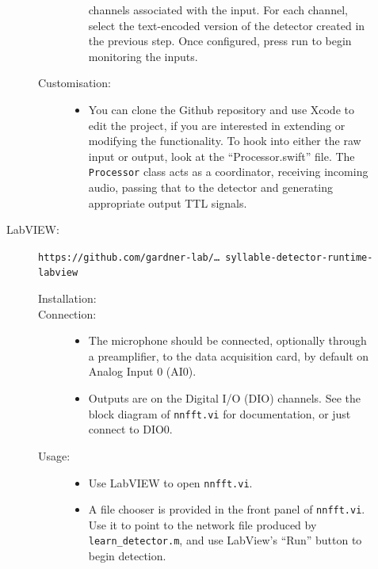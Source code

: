 \documentclass[10pt,letterpaper]{article}
\begin{document}
\begin{description}
\begin{description}
\begin{description}
\begin{itemize}
      channels associated with the input. For each channel, select the text-encoded version of 
      the detector created in the previous step. Once configured, press run to begin 
      monitoring the inputs.
      \end{itemize}
    \item[Customisation:]\hfill
      \begin{itemize}
      \item You can clone the Github repository and use Xcode to edit the project, if you 
      are interested in extending or modifying the functionality. To hook into either 
      the raw input or output, look at the ``Processor.swift'' file. The 
      {\tt Processor} class acts as a coordinator, receiving incoming audio, passing that
      to the detector and generating appropriate output TTL signals.
      \end{itemize}
    \end{description}
  \item[LabVIEW:] {\tt https://github.com/gardner-lab/\dots\ syllable-detector-runtime-labview}
    \begin{description}
    \item[Installation:]\hfill
    \item[Connection:]\hfill
      \begin{itemize}
      \item The microphone should be connected, optionally through a preamplifier, to the data acquisition card, by default on Analog Input 0 (AI0).
      \item Outputs are on the Digital I/O (DIO) channels.  See the block diagram of {\tt nnfft.vi} for documentation, or just connect to DIO0.
      \end{itemize}
    \item[Usage:]\hfill
      \begin{itemize}
      \item Use LabVIEW to open {\tt nnfft.vi}.
        \item A file chooser is provided in the front panel of {\tt nnfft.vi}.  Use it to point to the network file
      produced by {\tt learn\_detector.m}, and use LabView's ``Run''
      button to begin detection.
      \end{itemize}
    \end{description}
  \end{description}

\end{description}


\end{document}
